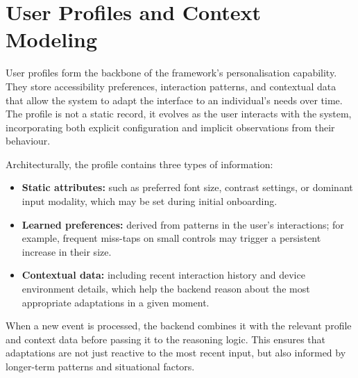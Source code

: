 \documentclass[openany]{book}
\begin{document}



\section{User Profiles and Context Modeling}
User profiles form the backbone of the framework’s personalisation capability. They store accessibility preferences, interaction patterns, and contextual data that allow the system to adapt the interface to an individual’s needs over time. The profile is not a static record, it evolves as the user interacts with the system, incorporating both explicit configuration and implicit observations from their behaviour.

Architecturally, the profile contains three types of information:
\begin{itemize}
    \item \textbf{Static attributes:} such as preferred font size, contrast settings, or dominant input modality, which may be set during initial onboarding.
    \item \textbf{Learned preferences:} derived from patterns in the user’s interactions; for example, frequent miss-taps on small controls may trigger a persistent increase in their size.
    \item \textbf{Contextual data:} including recent interaction history and device environment details, which help the backend reason about the most appropriate adaptations in a given moment.
\end{itemize}
When a new event is processed, the backend combines it with the relevant profile and context data before passing it to the reasoning logic. This ensures that adaptations are not just reactive to the most recent input, but also informed by longer-term patterns and situational factors.
\end{document}
